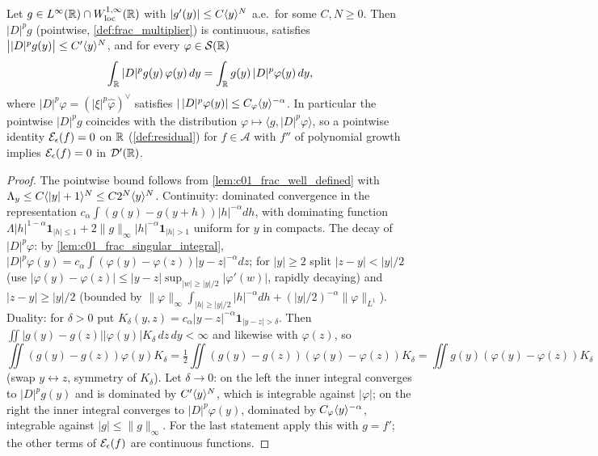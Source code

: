\begin{lemma}
  \label{lem:c01_frac_duality}
  Let $g\in L^\infty(\mathbb{R})\cap W^{1,\infty}_{\mathrm{loc}}(\mathbb{R})$ with $|g'(y)|\le C\langle y \rangle^N$ a.e.\ for
  some $C,N\ge0$.  Then $|D|^pg$ (pointwise, \cref{def:frac_multiplier}) is continuous, satisfies
  $\bigl||D|^pg(y)\bigr|\le C'\langle y \rangle^N$, and for every $\varphi\in\mathcal S(\mathbb{R})$
  \[
    \int_{\mathbb{R}} |D|^pg(y)\,\varphi(y)\,dy=\int_{\mathbb{R}} g(y)\,|D|^p\varphi(y)\,dy ,
  \]
  where $|D|^p\varphi=(|\xi|^p\widehat\varphi)^\vee$ satisfies
  $|\,|D|^p\varphi(y)|\le C_\varphi\langle y \rangle^{-\alpha}$.  In particular the pointwise $|D|^pg$
  coincides with the distribution $\varphi\mapsto\langle g,|D|^p\varphi\rangle$, so a pointwise
  identity $\mathcal{E}_\epsilon(f)=0$ on $\mathbb{R}$ (\cref{def:residual}) for $f\in\mathcal A$ with $f''$ of
  polynomial growth implies $\mathcal{E}_\epsilon(f)=0$ in $\mathcal D'(\mathbb{R})$.
\end{lemma}
\begin{proof}
  The pointwise bound follows from \cref{lem:c01_frac_well_defined} with
  $\Lambda_y\le C\langle |y|+1 \rangle^N\le C2^N\langle y \rangle^N$.  Continuity: dominated convergence in the
  representation $c_\alpha\int(g(y)-g(y+h))|h|^{-\alpha}dh$, with dominating function
  $\Lambda|h|^{1-\alpha}\mathbf 1_{|h|\le1}+2\|g\|_\infty|h|^{-\alpha}\mathbf 1_{|h|>1}$ uniform for
  $y$ in compacts.  The decay of $|D|^p\varphi$: by \cref{lem:c01_frac_singular_integral},
  $|D|^p\varphi(y)=c_\alpha\int(\varphi(y)-\varphi(z))|y-z|^{-\alpha}dz$; for $|y|\ge2$ split
  $|z-y|<|y|/2$ (use $|\varphi(y)-\varphi(z)|\le|y-z|\sup_{|w|\ge|y|/2}|\varphi'(w)|$, rapidly
  decaying) and $|z-y|\ge|y|/2$ (bounded by $\|\varphi\|_\infty\int_{|h|\ge|y|/2}|h|^{-\alpha}dh
  +(|y|/2)^{-\alpha}\|\varphi\|_{L^1}$).  Duality: for $\delta>0$ put
  $K_\delta(y,z)=c_\alpha|y-z|^{-\alpha}\mathbf 1_{|y-z|>\delta}$.  Then
  $\iint|g(y)-g(z)||\varphi(y)|K_\delta\,dz\,dy<\infty$ and likewise with $\varphi(z)$, so
  \[
    \iint (g(y)-g(z))\varphi(y)K_\delta
    =\tfrac12\iint(g(y)-g(z))(\varphi(y)-\varphi(z))K_\delta
    =\iint g(y)(\varphi(y)-\varphi(z))K_\delta
  \]
  (swap $y\leftrightarrow z$, symmetry of $K_\delta$).  Let $\delta\to0$: on the left the inner
  integral converges to $|D|^pg(y)$ and is dominated by $C'\langle y \rangle^N$, which is integrable
  against $|\varphi|$; on the right the inner integral converges to $|D|^p\varphi(y)$, dominated
  by $C_\varphi\langle y \rangle^{-\alpha}$, integrable against $|g|\le\|g\|_\infty$.  For the last
  statement apply this with $g=f'$; the other terms of $\mathcal{E}_\epsilon(f)$ are continuous
  functions.
\end{proof}

